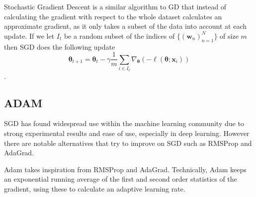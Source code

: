 Stochastic Gradient Descent is a similar algorithm to GD that instead of
calculating the gradient with respect to the whole dataset calculates an
approximate gradient, as it only takes a subset of the data into account at each
update. If we let $I_t$ be a random subset of the indices of $\{(\bm{w}_n)_{n=1}^N\}$ of size $m$ then SGD does the following update
\begin{equation}
  \label{eq:SGD_update}
  \bm{\theta}_{t + 1} = \bm{\theta}_t - \gamma \frac{1}{m} \sum_{i \in I_t} \nabla_{\bm{\theta}} (-\ell(\bm{\theta}; \bm{x}_i))
\end{equation}\cite{series/lncs/Bottou12}\cite[p.~240]{Bishop:2006}.

\subsection{ADAM}
SGD has found widespread use within the machine learning community due to strong
experimental results and ease of use, especially in deep learning. However there
are notable alternatives that try to improve on SGD such as
RMSProp\cite{Tieleman2012} and AdaGrad\cite{Duchi:EECS-2010-24}.

Adam takes inspiration from RMSProp and AdaGrad. Technically, Adam keeps an
exponential running average of the first and second order statistics of the
gradient, using these to calculate an adaptive learning rate.

